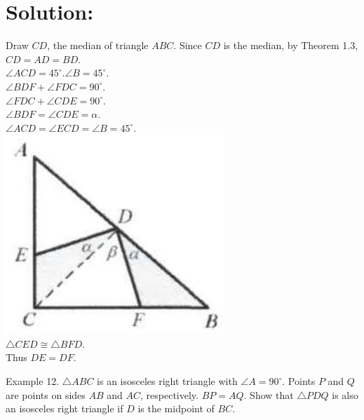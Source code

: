 \documentclass[10pt]{article}
\begin{document}
\section*{Solution:}
Draw \(C D\), the median of triangle \(A B C\). Since \(C D\) is the median, by Theorem 1.3, \(C D=A D=B D\).\\
\(\angle A C D=45^{\circ} . \angle B=45^{\circ}\).\\
\(\angle B D F+\angle F D C=90^{\circ}\).\\
\(\angle F D C+\angle C D E=90^{\circ}\).\\
\(\angle B D F=\angle C D E=\alpha\).\\
\(\angle A C D=\angle E C D=\angle B=45^{\circ}\).\\
\includegraphics[max width=\textwidth, center]{2025_04_17_97bc1f7e44d93c271a88g-013}\\
\(\triangle C E D \cong \triangle B F D\).\\
Thus \(D E=D F\).

Example 12. \(\triangle A B C\) is an isosceles right triangle with \(\angle A=90^{\circ}\). Points \(P\) and \(Q\) are points on sides \(A B\) and \(A C\), respectively. \(B P=A Q\). Show that \(\triangle P D Q\) is also an isosceles right triangle if \(D\) is the midpoint of \(B C\).
\end{document}
